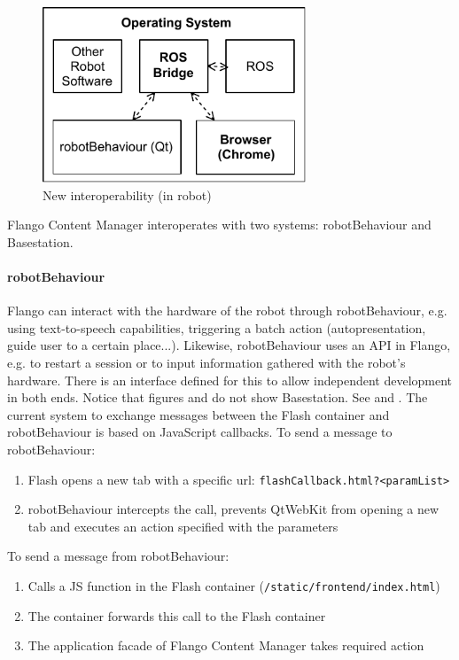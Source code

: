 \begin{figure}[htb]
    \label{fig:interoperability-new}
    \centering
    \includegraphics[width=0.7\textwidth]{figures/interoperability-new}
    \caption{New interoperability (in robot)}
\end{figure}

Flango Content Manager interoperates with two systems: robotBehaviour and Basestation.

\paragraph{robotBehaviour} Flango can interact with the hardware of the robot through robotBehaviour, e.g. using text-to-speech capabilities, triggering a batch action (autopresentation, guide user to a certain place...).
Likewise, robotBehaviour uses an API in Flango, e.g. to restart a session or to input information gathered with the robot's hardware.
There is an interface defined for this to allow independent development in both ends.
Notice that figures  and  do not show Basestation. See  and .
The current system to exchange messages between the Flash container and robotBehaviour is based on JavaScript callbacks.
To send a message to robotBehaviour:
\begin{enumerate}
    \item Flash opens a new tab with a specific url: \texttt{flashCallback.html?\textless paramList\textgreater}
    \item robotBehaviour intercepts the call, prevents QtWebKit from opening a new tab and executes an action specified with the parameters
\end{enumerate}

To send a message from robotBehaviour:
\begin{enumerate}
    \item Calls a \ac{JS} function in the Flash container (\texttt{/static/frontend/index.html})
    \item The container forwards this call to the Flash container
    \item The application facade of Flango Content Manager takes required action
\end{enumerate}

